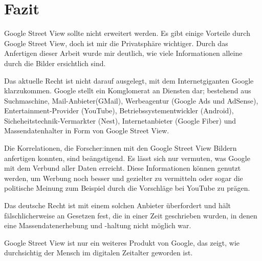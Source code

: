 \newpage

\section{Fazit} \label{fazit}

Google Street View sollte nicht erweitert werden. Es gibt einige Vorteile durch
Google Street View, doch ist mir die Privatsphäre wichtiger. Durch das
Anfertigen dieser Arbeit wurde mir deutlich, wie viele Informationen alleine
durch die Bilder ersichtlich sind.

Das aktuelle Recht ist nicht darauf ausgelegt, mit dem Internetgiganten Google
klarzukommen. Google stellt ein Komglomerat an Diensten dar; bestehend aus
Suchmaschine, Mail-Anbieter(GMail), Werbeagentur (Google Ads und AdSense),
Entertainment-Provider (YouTube), Betriebssystementwickler (Android),
Sicheheitstechnik-Vermarkter (Nest), Internetanbieter (Google Fiber) und
Massendatenhalter in Form von Google Street View.

Die Korrelationen, die Forscher:innen mit den Google Street View Bildern
anfertigen konnten, sind beängstigend. Es lässt sich nur vermuten, was Google
mit dem Verbund aller Daten erreicht. Diese Informationen können genutzt
werden, um Werbung noch besser und gezielter zu vermitteln oder sogar die
politische Meinung zum Beispiel durch die Vorschläge bei YouTube zu prägen.

Das deutsche Recht ist mit einem solchen Anbieter überfordert und hält
fälschlicherweise an Gesetzen fest, die in einer Zeit geschrieben wurden, in
denen eine Massendatenerhebung und -haltung nicht möglich war.

Google Street View ist nur ein weiteres Produkt von Google, das zeigt, wie
durchsichtig der Mensch im digitalen Zeitalter geworden ist.
